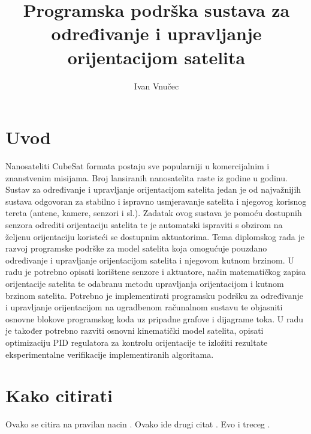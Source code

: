 \documentclass[times, utf8, diplomski, numeric]{templates/fer}
\begin{document}

\title{Programska podrška sustava za određivanje i upravljanje orijentacijom satelita}

\author{Ivan Vnučec}

\maketitle

\izvornik


\tableofcontents

\chapter{Uvod}
Nanosateliti CubeSat formata postaju sve popularniji u komercijalnim i znanstvenim misijama. Broj lansiranih nanosatelita raste iz godine u godinu. Sustav za određivanje i upravljanje orijentacijom satelita jedan je od najvažnijih sustava odgovoran za stabilno i ispravno usmjeravanje satelita i njegovog korisnog tereta (antene, kamere, senzori i sl.). Zadatak ovog sustava je pomoću dostupnih senzora odrediti orijentaciju satelita te je automatski ispraviti s obzirom na željenu orijentaciju koristeći se dostupnim aktuatorima. Tema diplomskog rada je razvoj programske podrške za model satelita koja omogućuje pouzdano određivanje i upravljanje orijentacijom satelita i njegovom kutnom brzinom. U radu je potrebno opisati korištene senzore i aktuatore, način matematičkog zapisa orijentacije satelita te odabranu metodu upravljanja orijentacijom i kutnom brzinom satelita. Potrebno je implementirati programsku podršku za određivanje i upravljanje orijentacijom na ugradbenom računalnom sustavu te objasniti osnovne blokove programskog koda uz pripadne grafove i dijagrame toka. U radu je također potrebno razviti osnovni kinematički model satelita, opisati optimizaciju PID regulatora za kontrolu orijentacije te izložiti rezultate eksperimentalne verifikacije implementiranih algoritama. 

\chapter{Kako citirati}
Ovako se citira na pravilan nacin \cite{oetiket2007lshort}. Ovako ide drugi citat \cite{downes2002shortams}. Evo i treceg \cite{ungar2002uvod}.
\end{document}
